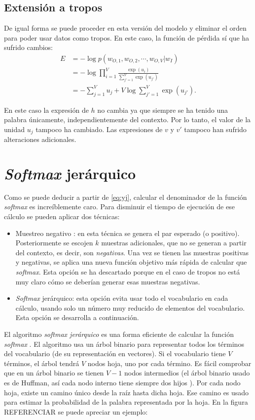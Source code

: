 \subsection{Extensión a tropos}

De igual forma se puede proceder en esta versión del modelo y eliminar el orden para poder usar datos como tropos. En este caso, la función de pérdida
sí que ha sufrido cambios:
\begin{align}
  E & = - \log p\left( w_{O,1}, w_{O,2}, \cdots, w_{O,V} | w_I \right) \\
    & = - \log \prod_{i=1}^V \frac{\exp(u_i)}{\sum_{j'=1}^V\exp(u_{j'})} \\
    & = - \sum_{j=1}^V u_{j} + V\log \sum_{j'=1}^V\exp(u_{j'}).
\end{align}

En este caso la expresión de $h$ no cambia ya que siempre se ha tenido una palabra únicamente, independientemente del contexto. Por lo
tanto, el valor de la unidad $u_{j}$ tampoco ha cambiado. Las expresiones de $v$ y $v'$ tampoco han sufrido alteraciones adicionales.

\section{\textit{Softmax} jerárquico}

Como se puede deducir a partir de \ref{eq:yj}, calcular el denominador de la función \textit{softmax} es increíblemente caro. Para disminuir el tiempo de ejecución de ese cálculo
se pueden aplicar dos técnicas:

\begin{itemize}
  \item Muestreo negativo \cite{goldberg2014word2vec}: en esta técnica se genera el par esperado (o positivo). Posteriormente se escojen $k$ muestras adicionales, que no se generan a partir del contexto, es decir, son \textit{negativas}.
  Una vez se tienen las muestras positivas y negativas, se aplica una nueva función objetivo más rápida de calcular que \textit{softmax}. Esta opción se ha descartado porque en el caso de tropos no
  está muy claro cómo se deberían generar esas muestras negativas.
  \item \textit{Softmax} jerárquico: esta opción evita usar todo el vocabulario en cada cálculo, usando solo un número muy reducido de elementos del vocabulario. Esta opción se desarrolla a continuación.
\end{itemize}

El algoritmo \textit{softmax jerárquico} es una forma eficiente de calcular la función \textit{softmax} \cite{morin2005hierarchical}. El algoritmo usa un árbol binario para representar todos los términos
del vocabulario (de su representación en vectores). Si el vocabulario tiene $V$ términos, el árbol tendrá $V$ nodos hoja, uno por cada término. Es fácil comprobar que en un árbol binario se tienen $V-1$ nodos intermedios (el árbol binario
usado es de Huffman, así cada nodo interno tiene siempre dos hijos \cite{van1976construction}).
Por cada nodo hoja, existe un camino único desde la raíz hasta dicha hoja. Ese camino es usado para estimar la probabilidad de la palabra representada por la hoja. En la figura REFERENCIAR se puede apreciar un
ejemplo:


